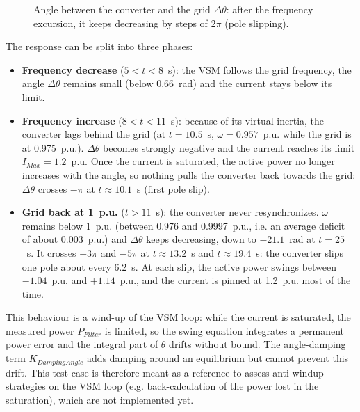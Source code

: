 \documentclass[a4paper, 12pt]{report}
\begin{document}
\begin{figure}[H]
\centering
{}
\caption{Angle between the converter and the grid $\Delta\theta$: after the frequency excursion, it keeps decreasing by steps of $2\pi$ (pole slipping).}
\label{fig:windup_theta}
\end{figure}

The response can be split into three phases:
\begin{itemize}
\item \textbf{Frequency decrease} ($5 < t < 8$~s): the VSM follows the grid frequency, the angle $\Delta\theta$ remains small (below 0.66~rad) and the current stays below its limit.
\item \textbf{Frequency increase} ($8 < t < 11$~s): because of its virtual inertia, the converter lags behind the grid (at $t = 10.5$~s, $\omega = 0.957$~p.u. while the grid is at 0.975~p.u.). $\Delta\theta$ becomes strongly negative and the current reaches its limit $I_{Max} = 1.2$~p.u. Once the current is saturated, the active power no longer increases with the angle, so nothing pulls the converter back towards the grid: $\Delta\theta$ crosses $-\pi$ at $t \approx 10.1$~s (first pole slip).
\item \textbf{Grid back at 1~p.u.} ($t > 11$~s): the converter never resynchronizes. $\omega$ remains below 1~p.u. (between 0.976 and 0.9997~p.u., i.e. an average deficit of about 0.003~p.u.) and $\Delta\theta$ keeps decreasing, down to $-21.1$~rad at $t = 25$~s. It crosses $-3\pi$ and $-5\pi$ at $t \approx 13.2$~s and $t \approx 19.4$~s: the converter slips one pole about every 6.2~s. At each slip, the active power swings between $-1.04$~p.u. and $+1.14$~p.u., and the current is pinned at 1.2~p.u. most of the time.
\end{itemize}

This behaviour is a wind-up of the VSM loop: while the current is saturated, the measured power $P_{Filter}$ is limited, so the swing equation integrates a permanent power error and the integral part of $\theta$ drifts without bound. The angle-damping term $K_{DampingAngle}$ adds damping around an equilibrium but cannot prevent this drift. This test case is therefore meant as a reference to assess anti-windup strategies on the VSM loop (e.g. back-calculation of the power lost in the saturation), which are not implemented yet.
\newpage
\end{document}
